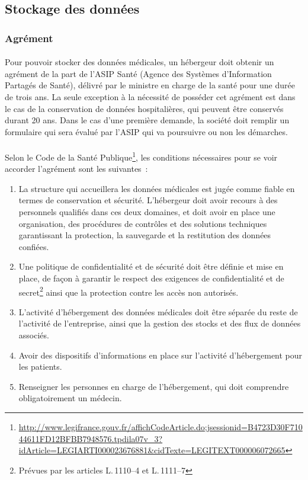         \subsection{Stockage des données}
            \subsubsection{Agrément}

\paragraph{}
Pour pouvoir stocker des données médicales, un hébergeur doit obtenir un
agrément de la part de l'ASIP Santé (Agence des Systèmes d'Information Partagés
de Santé), délivré par le ministre en charge de la santé pour une durée de
trois ans. La seule exception à la nécessité de posséder cet agrément est dans
le cas de la conservation de données hospitalières, qui peuvent être conservés
durant 20 ans. Dans le cas d'une première demande, la société doit remplir un
formulaire qui sera évalué par l'ASIP qui va poursuivre ou non les démarches.

\paragraph{}
Selon le Code de la Santé
Publique\footnote{\url{http://www.legifrance.gouv.fr/affichCodeArticle.do;jsessionid=B4723D30F71044611FD12BFBB7948576.tpdila07v_3?idArticle=LEGIARTI000023676881&cidTexte=LEGITEXT000006072665}},
les conditions nécessaires pour se voir accorder l'agrément sont les
suivantes~:
\begin{enumerate}
    \item La structure qui accueillera les données médicales est jugée comme
        fiable en termes de conservation et sécurité. L'hébergeur doit avoir
        recours à des personnels qualifiés dans ces deux domaines, et doit
        avoir en place une organisation, des procédures de contrôles et des
        solutions techniques garantissant la protection, la sauvegarde et la
        restitution des données confiées.
    \item Une politique de confidentialité et de sécurité doit être définie et
        mise en place, de façon à garantir le respect des exigences de
        confidentialité et de secret\footnote{Prévues par les articles
        L.\,1110--4 et L.\,1111--7} ainsi que la protection contre les accès
        non autorisés.
    \item L'activité d'hébergement des données médicales doit être séparée du
        reste de l'activité de l'entreprise, ainsi que la gestion des stocks et
        des flux de données associés.
    \item Avoir des dispositifs d'informations en place sur l'activité
        d'hébergement pour les patients.
    \item Renseigner les personnes en charge de l'hébergement, qui doit
        comprendre obligatoirement un médecin.
\end{enumerate}


